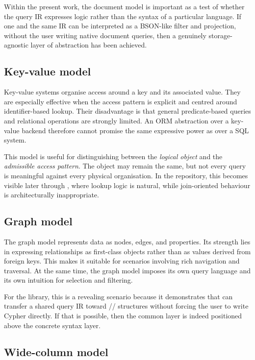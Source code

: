 Within the present work, the document model is important as a test of whether the query IR expresses logic rather than the syntax of a particular language. If one and the same IR can be interpreted as a BSON-like filter and projection, without the user writing native document queries, then a genuinely storage-agnostic layer of abstraction has been achieved.

\subsection{Key-value model}

Key-value systems organise access around a key and its associated value. They are especially effective when the access pattern is explicit and centred around identifier-based lookup. Their disadvantage is that general predicate-based queries and relational operations are strongly limited. An ORM abstraction over a key-value backend therefore cannot promise the same expressive power as over a SQL system.

This model is useful for distinguishing between the \emph{logical object} and the \emph{admissible access pattern}. The object may remain the same, but not every query is meaningful against every physical organisation. In the repository, this becomes visible later through , where lookup logic is natural, while join-oriented behaviour is architecturally inappropriate.

\subsection{Graph model}

The graph model represents data as nodes, edges, and properties. Its strength lies in expressing relationships as first-class objects rather than as values derived from foreign keys. This makes it suitable for scenarios involving rich navigation and traversal. At the same time, the graph model imposes its own query language and its own intuition for selection and filtering.

For the library, this is a revealing scenario because it demonstrates that  can transfer a shared query IR toward // structures without forcing the user to write Cypher directly. If that is possible, then the common layer is indeed positioned above the concrete syntax layer.

\subsection{Wide-column model}

